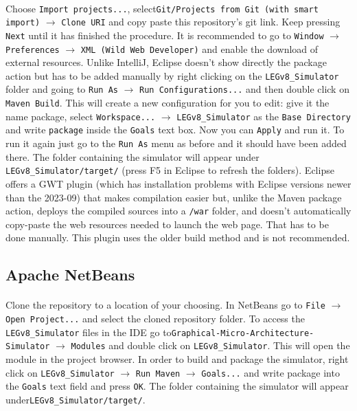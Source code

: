 \paragraph{}
Choose \verb|Import projects...|, select\newline \verb|Git/Projects from Git (with smart import)| $\longrightarrow$ \verb|Clone URI| and copy paste this repository's git link. Keep pressing \verb|Next| until it has finished the procedure. It is recommended to go to \verb|Window| $\longrightarrow$ \verb|Preferences| $\longrightarrow$ \verb|XML (Wild Web Developer)| and enable the download of external resources. Unlike IntelliJ, Eclipse doesn't show directly the package action but has to be added manually by right clicking on the \verb|LEGv8_Simulator| folder and going to \verb|Run As| $\longrightarrow$ \verb|Run Configurations...| and then double click on \verb|Maven Build|. This will create a new configuration for you to edit: give it the name package, select \verb|Workspace...| $\longrightarrow$ \verb|LEGv8_Simulator| as the \verb|Base Directory| and write \verb|package| inside the \verb|Goals| text box. Now you can \verb|Apply| and run it. To run it again just go to the \verb|Run As| menu as before and it should have been added there. The folder containing the simulator will appear under \verb|LEGv8_Simulator/target/| (press F5 in Eclipse to refresh the folders).
Eclipse offers a GWT plugin (which has installation problems with Eclipse versions newer than the 2023-09) that makes compilation easier but, unlike the Maven package action, deploys the compiled sources into a \verb|/war| folder, and doesn't automatically copy-paste the web resources needed to launch the web page. That has to be done manually. This plugin uses the older build method and is not recommended.
\subsection{Apache NetBeans}
\paragraph{}
Clone the repository to a location of your choosing. In NetBeans go to \verb|File| $\longrightarrow$ \verb|Open Project...| and select the cloned repository folder. To access the \verb|LEGv8_Simulator| files in the IDE go to\newline \verb|Graphical-Micro-Architecture-Simulator| $\longrightarrow$ \verb|Modules| and double click on \verb|LEGv8_Simulator|. This will open the module in the project browser. In order to build and package the simulator, right click on \verb|LEGv8_Simulator| $\longrightarrow$ \verb|Run Maven| $\longrightarrow$ \verb|Goals...| and write package into the \verb|Goals| text field and press \verb|OK|. The folder containing the simulator will appear under\newline \verb|LEGv8_Simulator/target/|.